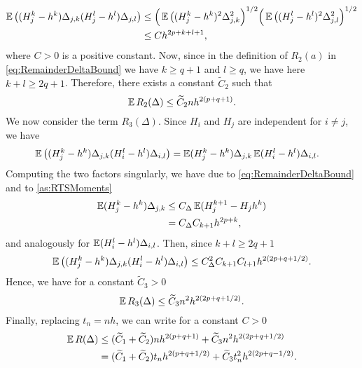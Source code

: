 \documentclass[10pt]{article}
\begin{document}
	\begin{equation}
	\begin{aligned}
		 \operatorname{\mathbb{E}} \big((H_j^k - h^k)\Delta_{j,k}(H_j^l - h^l) \Delta_{j,l}\big) &\leq \Big(\operatorname{\mathbb{E}} \big((H_j^k - h^k)^2\Delta_{j,k}^2\Big)^{1/2} \Big(\operatorname{\mathbb{E}} \big((H_j^l - h^l)^2\Delta_{j,l}^2\Big)^{1/2}\\
		 &\leq C h^{2p+k+l+1},
	\end{aligned}
	\end{equation}
	where $C > 0$ is a positive constant. Now, since {in the definition of $R_2(a)$ in \eqref{eq:RemainderDeltaBound} we have $k \geq q+1$ and $l \geq q$, we have here $k+l \geq 2q+1$}. Therefore, there exists a constant $\tilde C_2$ such that
	\begin{equation}
		\operatorname{\mathbb{E}} R_2(\Delta) \leq \widetilde C_2 n h^{2(p+q+1)}.
	\end{equation}	
	We now consider the term $R_3(\Delta)$. Since $H_i$ and $H_j$ are independent for $i \neq j$, we have
	\begin{equation}
	\begin{aligned}
		\operatorname{\mathbb{E}} \big((H_j^k - h^k)\Delta_{j,k}(H_i^l - h^l) \Delta_{i,l}\big) &= \operatorname{\mathbb{E}} (H_j^k - h^k)\Delta_{j,k} \operatorname{\mathbb{E}} (H_i^l - h^l) \Delta_{i,l}.
	\end{aligned}
	\end{equation}
	Computing the two factors singularly, we have {due to \eqref{eq:RemainderDeltaBound} and to \cref{as:RTSMoments}}
	\begin{equation}\label{eq:RemainderThirdBound}
	\begin{aligned}
		\operatorname{\mathbb{E}} (H_j^k - h^k)\Delta_{j,k} &\leq C_\Delta \operatorname{\mathbb{E}}(H_j^{k+1} - H_jh^k) \\
		&= C_\Delta C_{k+1} h^{2p+k},
	\end{aligned}
	\end{equation}
	and analogously for $\operatorname{\mathbb{E}} (H_i^l - h^l) \Delta_{i,l}$. Then, since $k+l \geq 2q+1$
	\begin{equation}\label{eq:RemainderFourthBound}
		\operatorname{\mathbb{E}} \big((H_j^k - h^k)\Delta_{j,k}(H_i^l - h^l) \Delta_{i,l}\big) \leq C_\Delta^2 C_{k+1} C_{l+1} h^{2(2p+q+1/2)}.
	\end{equation}
	Hence, we have for a constant $\tilde C_3 > 0$ 
	\begin{equation}
		\operatorname{\mathbb{E}} R_3(\Delta) \leq \widetilde C_3 n^2 h^{2(2p+q+1/2)}.
	\end{equation}
	Finally, replacing $t_n = nh$, we can write for a constant $C > 0$
	\begin{equation}
	\begin{aligned}
		\operatorname{\mathbb{E}} R(\Delta) &\leq (\widetilde C_1 + \widetilde C_2) n h^{2(p+q+1)} + \widetilde C_3 n^2 h^{2(2p+q+1/2)}\\
		&= (\widetilde C_1 + \widetilde C_2) t_n h^{2(p + q + 1/2)} + \widetilde C_3 t_n^2 h^{2(2p + q - 1/2)}.
	\end{aligned}
	\end{equation}
\end{document}
